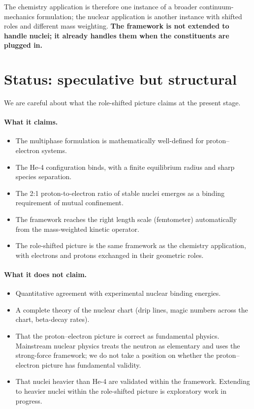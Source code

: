 The chemistry application is therefore one instance of a broader continuum-mechanics formulation; the nuclear application is another instance with shifted roles and different mass weighting. \textbf{The framework is not extended to handle nuclei; it already handles them when the constituents are plugged in.}

\section{Status: speculative but structural}\label{sec:nuc-status}

We are careful about what the role-shifted picture claims at the present stage.

\paragraph{What it claims.}
\begin{itemize}
\item The multiphase formulation is mathematically well-defined for proton--electron systems.
\item The He-4 configuration binds, with a finite equilibrium radius and sharp species separation.
\item The 2:1 proton-to-electron ratio of stable nuclei emerges as a binding requirement of mutual confinement.
\item The framework reaches the right length scale (femtometer) automatically from the mass-weighted kinetic operator.
\item The role-shifted picture is the same framework as the chemistry application, with electrons and protons exchanged in their geometric roles.
\end{itemize}

\paragraph{What it does not claim.}
\begin{itemize}
\item Quantitative agreement with experimental nuclear binding energies.
\item A complete theory of the nuclear chart (drip lines, magic numbers across the chart, beta-decay rates).
\item That the proton--electron picture is correct as fundamental physics. Mainstream nuclear physics treats the neutron as elementary and uses the strong-force framework; we do not take a position on whether the proton--electron picture has fundamental validity.
\item That nuclei heavier than He-4 are validated within the framework. Extending to heavier nuclei within the role-shifted picture is exploratory work in progress.
\end{itemize}

